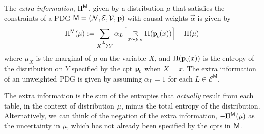 \documentclass{article}
\newcommand{\bp}[1][L]{\mat{p}_{\!_{#1}\!}}
\newcommand{\Ed}{\mathcal E}
\newcommand{\sfM}{\mathsf M}
\newcommand{\alle}[1][L]{_{ X \xrightarrow{\!\!#1} Y }}
\numberwithin{equation}{section}
\begin{document}
	\begin{defn}\label{def:extra}
		The \emph{extra information}, $\H^{\sfM}$, given by a distribution $\mu$ that satisfies the constraints of a PDG $\sfM = \mnvars[]$ with causal weights $\vec \alpha$ is given by
		\[ \H^{\sfM}(\mu) := \sum\alle \alpha_L \Big[ \E_{x \sim \mu_X}  \H (\bp (x))  \Big] - \H(\mu) \] 
		where $\mu_X$ is the marginal of $\mu$ on the variable $X$, and $\H(\bp(x))$ is the entropy of the distribution on $Y$ specified by the cpt $\bp$ when $X = x$. The extra information of an unweighted PDG is given by assuming $\alpha_L = 1$ for each $L \in \Ed^\sfM$.
	\end{defn}
	The extra information is the sum of the entropies that \emph{actually} result from each table, in the context of distribution $\mu$, minus the total entropy of the distribution.
	Alternatively, we can think of the negation of the extra
        information, $-\H^\sfM(\mu)$ as the uncertainty in $\mu$,
        which has not already been specified by the cpts in $\sf M$.

\end{document}
